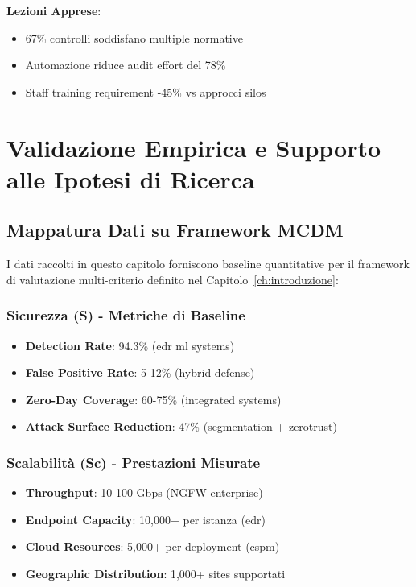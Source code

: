 \textbf{Lezioni Apprese}:
\begin{itemize}
    \item 67\% controlli soddisfano multiple normative
    \item Automazione riduce audit effort del 78\%
    \item Staff training requirement -45\% vs approcci silos
\end{itemize}

\section{Validazione Empirica e Supporto alle Ipotesi di Ricerca}
\label{sec:validazione-empirica}

\subsection{Mappatura Dati su Framework MCDM}
\label{subsec:mappatura-dati-mcdm}

I dati raccolti in questo capitolo forniscono baseline quantitative per il framework di valutazione multi-criterio definito nel Capitolo~\ref{ch:introduzione}:

\subsubsection{Sicurezza (S) - Metriche di Baseline}
\begin{itemize}
    \item \textbf{Detection Rate}: 94.3\% (\gls{edr} \gls{ml} systems)
    \item \textbf{False Positive Rate}: 5-12\% (hybrid defense)
    \item \textbf{Zero-Day Coverage}: 60-75\% (integrated systems)
    \item \textbf{Attack Surface Reduction}: 47\% (segmentation + \gls{zerotrust})
\end{itemize}

\subsubsection{Scalabilità (Sc) - Prestazioni Misurate}
\begin{itemize}
    \item \textbf{Throughput}: 10-100 Gbps (NGFW enterprise)
    \item \textbf{Endpoint Capacity}: 10,000+ per istanza (\gls{edr})
    \item \textbf{Cloud Resources}: 5,000+ per deployment (\gls{cspm})
    \item \textbf{Geographic Distribution}: 1,000+ sites supportati
\end{itemize}

